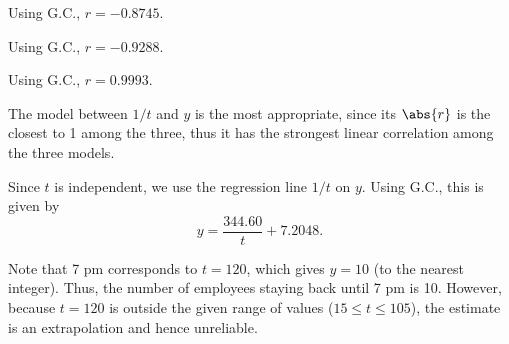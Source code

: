 \begin{solution}
    \begin{ppart}
        \begin{figure}[H]
        \centering
        \end{figure}
    \end{ppart}
    \begin{ppart}
        \begin{psubpart}
            Using G.C., $r = -0.8745$.
        \end{psubpart}
        \begin{psubpart}
            Using G.C., $r = -0.9288$.
        \end{psubpart}
        \begin{psubpart}
            Using G.C., $r = 0.9993$.
        \end{psubpart}

        The model between $1/t$ and $y$ is the most appropriate, since its $\abs{r}$ is the closest to 1 among the three, thus it has the strongest linear correlation among the three models.
    \end{ppart}
    \begin{ppart}
        Since $t$ is independent, we use the regression line $1/t$ on $y$. Using G.C., this is given by \[y = \frac{344.60}{t} + 7.2048.\]
    \end{ppart}
    \begin{ppart}
        Note that 7 pm corresponds to $t = 120$, which gives $y = 10$ (to the nearest integer). Thus, the number of employees staying back until 7 pm is 10. However, because $t = 120$ is outside the given range of values ($15 \leq t \leq 105$), the estimate is an extrapolation and hence unreliable.
    \end{ppart}
\end{solution}